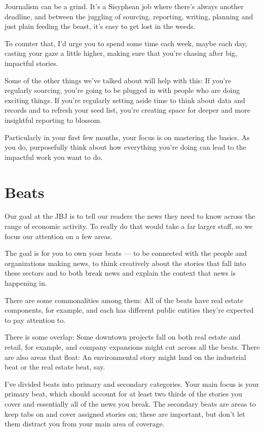 \documentclass[
  11pt,
  american,
  letterpaperpaper,
  extrafontsizes,onecolumn,openright
  ]{memoir}
\begin{document}
Journalism can be a grind. It's a Sisyphean job where there's always another deadline, and between the juggling of sourcing, reporting, writing, planning and just plain feeding the beast, it's easy to get lost in the weeds.

To counter that, I'd urge you to spend some time each week, maybe each day, casting your gaze a little higher, making sure that you're chasing after big, impactful stories.

Some of the other things we've talked about will help with this: If you're regularly sourcing, you're going to be plugged in with people who are doing exciting things. If you're regularly setting aside time to think about data and records and to refresh your seed list, you're creating space for deeper and more insightful reporting to blossom.

Particularly in your first few months, your focus is on mastering the basics. As you do, purposefully think about how everything you're doing can lead to the impactful work you want to do.

\hypertarget{appendix-appendix}{%
\appendix}


\hypertarget{beats}{%
\chapter{Beats}\label{beats}}

Our goal at the JBJ is to tell our readers the news they need to know across the range of economic activity. To really do that would take a far larger staff, so we focus our attention on a few areas.

The goal is for you to own your beats --- to be connected with the people and organizations making news, to think creatively about the stories that fall into these sectors and to both break news and explain the context that news is happening in.

There are some commonalities among them: All of the beats have real estate components, for example, and each has different public entities they're expected to pay attention to.

There is some overlap: Some downtown projects fall on both real estate and retail, for example, and company expansions might cut across all the beats. There are also areas that float: An environmental story might land on the industrial beat or the real estate beat, say.

I've divided beats into primary and secondary categories. Your main focus is your primary beat, which should account for at least two thirds of the stories you cover and essentially all of the news you break. The secondary beats are areas to keep tabs on and cover assigned stories on; these are important, but don't let them distract you from your main area of coverage.
\end{document}

